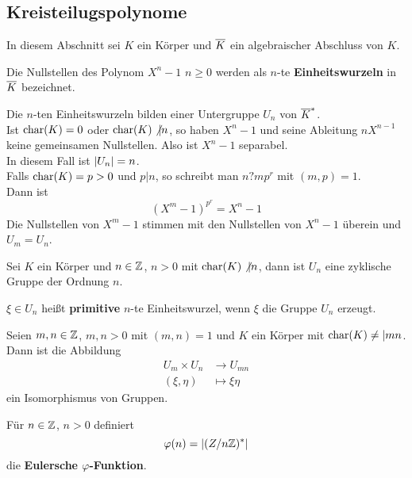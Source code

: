 	\subsection{Kreisteilugspolynome}
	In diesem Abschnitt sei $K$ ein Körper und $\overline{K}$ ein algebraischer Abschluss von $K$.
	\begin{definition}
		Die Nullstellen des Polynom $X^n-1$ $n\geq 0$ werden als $n$-te \textbf{Einheitswurzeln} in $\overline{K}$ bezeichnet.\\
	\end{definition}
	\begin{prop}
		Die $n$-ten Einheitswurzeln bilden einer Untergruppe $U_n$ von $\overline{K}^*$.\\
		Ist $\operatorname{char}(K)=0$ oder $\operatorname{char}(K)\not|n$, so haben $X^n-1$ und seine Ableitung $nX^{n-1}$ keine gemeinsamen Nullstellen. Also ist $X^n-1$ separabel.\\
		In diesem Fall ist $\left|U_n\right|=n$.\\
		Falls $\operatorname{char}(K)=p>0$ und $p|n$, so schreibt man $n?mp^r$ mit $(m,p)=1$.\\
		Dann ist
		\[(X^m-1)^{p^r}=X^n-1\]
		Die Nullstellen von $X^m-1$ stimmen mit den Nullstellen von $X^n-1$ überein und $U_m=U_n$.\\
	\end{prop}

	\begin{satz}
		Sei $K$ ein Körper und $n\in\mathbb{Z}$, $n>0$ mit $\operatorname{char}(K)\not|n$, dann ist $U_n$ eine zyklische Gruppe der Ordnung $n$.
	\end{satz}

	\begin{definition}
		$\xi\in U_n$ heißt \textbf{primitive} $n$-te Einheitswurzel, wenn $\xi$ die Gruppe $U_n$ erzeugt. 
	\end{definition}

	\begin{satz}
		Seien $m,n\in\mathbb{Z}$, $m,n>0$ mit $(m,n)=1$ und $K$ ein Körper mit $\operatorname{char}(K)\neq| mn$.\\
		Dann ist die Abbildung
		\begin{align*}
		U_m\times U_n&\to U_{mn}\\
		(\xi,\eta)&\mapsto\xi\eta
		\end{align*}
		ein Isomorphismus  von Gruppen.
	\end{satz}

	\begin{definition}
		Für $n\in\mathbb{Z}$, $n>0$ definiert
		\[\varphi(n)=\left|(Z/n\mathbb{Z})^*\right|\]
		die \textbf{Eulersche $\varphi$-Funktion}.
	\end{definition}

